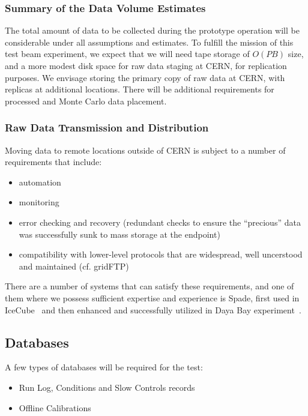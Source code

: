\subsubsection{Summary of the Data Volume Estimates}
The total amount of data to be collected during the prototype operation will be considerable under all assumptions and estimates.
To fulfill the mission of this test beam experiment, we expect that we will need tape storage of $O(PB)$ size,
and a more modest disk space for raw data staging at CERN, for replication purposes. We envisage storing the primary copy of raw data
at CERN, with replicas at additional locations. There will be additional requirements for processed and Monte Carlo data placement.


\subsubsection{Raw Data Transmission and Distribution}
Moving data to remote locations outside of CERN is subject to a number of requirements that include:
\begin{itemize}
\item automation
\item monitoring
\item error checking and recovery (redundant checks to ensure the ``precious'' data was successfully sunk to mass storage at the endpoint)
\item compatibility with lower-level protocols that are widespread, well uncerstood and maintained (cf. gridFTP)
\end{itemize}

There are a number of systems that can satisfy these requirements, and one of them where we possess sufficient expertise and experience is Spade, first used in IceCube~\cite{spade_icecube} and then enhanced and successfully utilized in Daya Bay experiment~\cite{spade_dayabay}.



\subsection{Databases}
A few types of databases will be required for the test:
\begin{itemize}
\item Run Log, Conditions and Slow Controls records
\item Offline Calibrations
\end{itemize}

